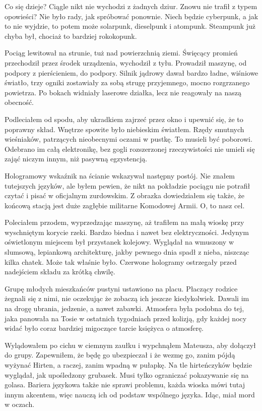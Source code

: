 \divider{}

Co się dzieje? 
Ciągle nikt nie wychodzi z żadnych dziur.
Znowu nie trafił z typem opowieści?
Nie było rady, jak spróbować ponownie.
Niech będzie cyberpunk, a jak to nie wyjdzie, to potem może solarpunk, dieselpunk i atompunk. 
Steampunk już chyba był, chociaż to bardziej rokokopunk.

\divider{}

Pociąg lewitował na strunie, tuż nad powierzchnią ziemi.
Święcący promień przechodził przez środek urządzenia, wychodził z tyłu.
Prowadził maszynę, od podpory z pierścieniem, do podpory.
Silnik jądrowy dawał bardzo ładne, wiśniowe światło, trzy ogniki zostawiały za sobą strugę przyjemnego, mocno rozgrzanego powietrza.
Po bokach widniały laserowe działka, lecz nie reagowały na naszą obecność.

Podleciałem od spodu, aby ukradkiem zajrzeć przez okno i upewnić się, że to poprawny skład.
Wnętrze spowite było niebieskim światłem.
Rzędy smutnych wieśniaków, patrzących nieobecnymi oczami w pustkę.
To musieli być poborowi.
Odebrano im całą elektronikę, bez gogli rozszerzonej rzeczywistości nie umieli się zająć niczym innym, niż pasywną egzystencją.

Hologramowy wskaźnik na ścianie wskazywał następny postój.
Nie znałem tutejszych języków, ale byłem pewien, że nikt na pokładzie pociągu nie potrafił czytać i pisać w oficjalnym zurdowskim.
Z obrazka dowiedziałem się także, że końcową stacją jest duże zagłębie militarne Komodowej Armii.
O, to nasz cel.

Poleciałem przodem, wyprzedzając maszynę, aż trafiłem na małą wioskę przy wyschniętym korycie rzeki.
Bardzo biedna i nawet bez elektryczności.
Jedynym oświetlonym miejscem był przystanek kolejowy.
Wyglądał na wmuszony w slumsową, lepiankową architekturę, jakby pewnego dnia spadł z nieba, niszcząc kilka chatek. Może tak właśnie było.
Czerwone hologramy ostrzegały przed nadejściem składu za krótką chwilę.

Grupę młodych mieszkańców pustyni ustawiono na placu.
Płaczący rodzice żegnali się z nimi, nie oczekując że zobaczą ich jeszcze kiedykolwiek.
Dawali im na drogę ubrania, jedzenie, a nawet zabawki.
Atmosfera była podobna do tej, jaka panowała na Tosie w ostatnich tygodniach przed kolizją, gdy każdej nocy widać było coraz bardziej migoczące tarcie księżyca o atmosferę.

Wylądowałem po cichu w ciemnym zaułku i wypchnąłem Mateusza, aby dołączył do grupy.
Zapewniłem, że będę go ubezpieczał i że wezmę go, zanim pójdą wyżynać Hirten, a raczej, zanim wpadną w pułapkę.
Na tle hirteńczyków będzie wyglądał, jak upośledzony grubasek. Musi tylko ograniczać pokazywanie się na golasa.
Bariera językowa także nie sprawi problemu, każda wioska mówi tutaj innym akcentem, więc nauczą ich od podstaw wspólnego języka.
Idąc, miał mord w oczach.


